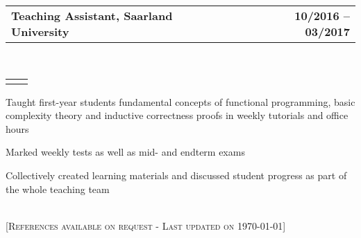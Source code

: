 \documentclass[]{lukas-cv}
\makeatletter
\newcommand{\headerrow}[2]
{\begin{tabular*}{\linewidth}{l@{\extracolsep{\fill}}r}
	\fontspec{Helvetica}\fontsize{12pt}{12pt}\selectfont\bfseries{\color{subheadings}#1} &
	\fontspec{Helvetica}\fontsize{12pt}{12pt}\selectfont\bfseries{\color{subheadings}#2} \\
\end{tabular*}}
\newcommand{\locationrow}[2]
{\begin{tabular*}{\linewidth}{l@{\extracolsep{\fill}}r}
        \color{headings}\scshape\fontspec{Heiti TC Medium}\fontsize{10pt}{12pt}\selectfont{#1}  &
        \color{headings}\scshape\fontspec{Heiti TC Medium}\fontsize{10pt}{12pt}\selectfont{#2}  \\
\end{tabular*}}
\makeatother
\begin{document}
\noindent
\headerrow{Teaching Assistant, Saarland University}{10/2016 -- 03/2017}
\\
\locationrow{Programming 1, Dependable Systems and Software Group}{}
\begin{tightitemize}{1.7em}
    \item Taught first-year students fundamental concepts of functional programming, basic complexity theory and inductive correctness proofs in weekly tutorials and office hours
    \item Marked weekly tests as well as mid- and endterm exams
    \item Collectively created learning materials and discussed student progress as part of the whole teaching team
\end{tightitemize}
\largesectionsep

\ \\

[\scshape{}\fontsize{10pt}{8pt}\selectfont References available on request - Last updated on \today]
\end{document}
